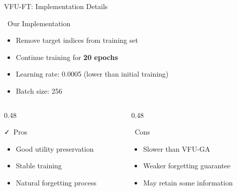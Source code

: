 \documentclass[aspectratio=169, 11pt]{beamer}
\begin{document}
\begin{frame}{VFU-FT: Implementation Details}
    \begin{block}{\faCode\ Our Implementation}
        \begin{itemize}
            \item Remove target indices from training set
            \item Continue training for \textbf{20 epochs}
            \item Learning rate: 0.0005 (lower than initial training)
            \item Batch size: 256
        \end{itemize}
    \end{block}
    
    \vspace{0.5em}
    \begin{columns}[T]
        \begin{column}{0.48\textwidth}
            \begin{exampleblock}{\faCheck\ Pros}
                \begin{itemize}
                    \item Good utility preservation
                    \item Stable training
                    \item Natural forgetting process
                \end{itemize}
            \end{exampleblock}
        \end{column}
        \begin{column}{0.48\textwidth}
            \begin{alertblock}{\faTimes\ Cons}
                \begin{itemize}
                    \item Slower than VFU-GA
                    \item Weaker forgetting guarantee
                    \item May retain some information
                \end{itemize}
            \end{alertblock}
        \end{column}
    \end{columns}
\end{frame}
\end{document}
